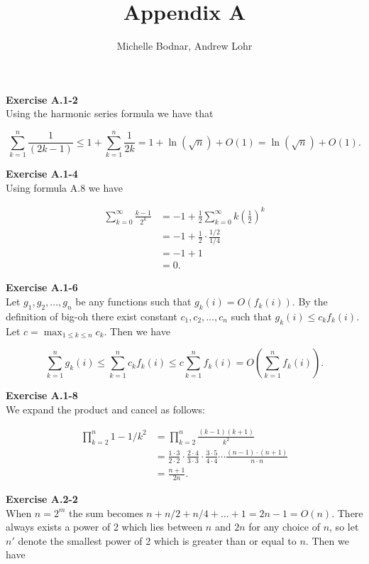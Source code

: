\documentclass{article}
\title{Appendix A}
\author{Michelle Bodnar, Andrew Lohr}
\begin{document}
\maketitle

\noindent\textbf{Exercise A.1-2}\\

Using the harmonic series formula we have that

\[\sum_{k=1}^n \frac{1}{(2k-1)} \leq 1 + \sum_{k=1}^n \frac{1}{2k} =  1 + \ln(\sqrt{n}) + O(1) =  \ln(\sqrt{n}) + O(1).\]

\noindent\textbf{Exercise A.1-4}\\

Using formula A.8 we have

\begin{align*}
\sum_{k=0}^\infty \frac{k-1}{2^k} &= -1 + \frac{1}{2} \sum_{k=0}^\infty k\left(\frac{1}{2}\right)^k \\
&= -1 + \frac{1}{2} \cdot \frac{ 1/2}{1/4} \\
&= -1 + 1 \\
&= 0.
\end{align*}

\noindent\textbf{Exercise A.1-6}\\

Let $g_1, g_2, \ldots, g_n$ be any functions such that $g_k(i) = O(f_k(i))$. By the definition of big-oh there exist constant $c_1, c_2, \ldots, c_n$ such that $g_k(i) \leq c_kf_k(i)$.  Let $c = \max_{1 \leq k \leq n} c_k$.  Then we have

 \[\sum_{k=1}^n g_k(i) \leq \sum_{k=1}^nc_kf_k(i) \leq c\sum_{k=1}^n f_k(i) = O\left(\sum_{k=1}^nf_k(i)\right).\]

\noindent\textbf{Exercise A.1-8}\\

We expand the product and cancel as follows:

\begin{align*}
\prod_{k=2}^n 1 - 1/k^2  &=  \prod_{k=2}^n \frac{(k-1)(k+1)}{k^2} \\
&= \frac{1 \cdot 3}{2 \cdot 2} \cdot \frac{2 \cdot 4}{3 \cdot 3} \cdot \frac{3 \cdot 5}{4 \cdot 4} \cdots \frac{(n-1)\cdot(n+1)}{n \cdot n} \\
&= \frac{n+1}{2n}.
\end{align*}

\noindent\textbf{Exercise A.2-2}\\

When $n = 2^m$ the sum becomes $n + n/2 + n/4 + \ldots + 1 = 2n - 1 = O(n)$.  There always exists a power of 2 which lies between $n$ and $2n$ for any choice of $n$, so let $n'$ denote the smallest power of 2 which is greater than or equal to $n$.  Then we have
\end{document}
